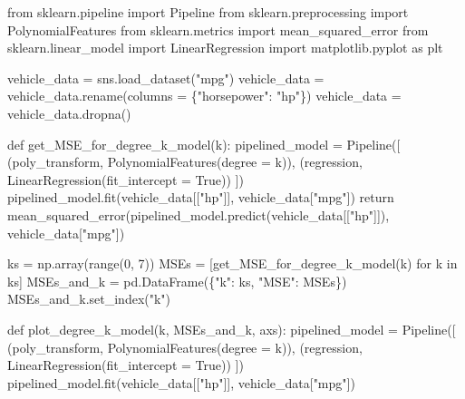 \documentclass[
  letterpaper,
  DIV=11,
  numbers=noendperiod]{scrreprt}
\newenvironment{Shaded}{\begin{snugshade}}{\end{snugshade}}
\newcommand{\BuiltInTok}[1]{\textcolor[rgb]{0.00,0.23,0.31}{#1}}
\newcommand{\ControlFlowTok}[1]{\textcolor[rgb]{0.00,0.23,0.31}{#1}}
\newcommand{\DecValTok}[1]{\textcolor[rgb]{0.68,0.00,0.00}{#1}}
\newcommand{\ImportTok}[1]{\textcolor[rgb]{0.00,0.46,0.62}{#1}}
\newcommand{\KeywordTok}[1]{\textcolor[rgb]{0.00,0.23,0.31}{#1}}
\newcommand{\NormalTok}[1]{\textcolor[rgb]{0.00,0.23,0.31}{#1}}
\newcommand{\OperatorTok}[1]{\textcolor[rgb]{0.37,0.37,0.37}{#1}}
\newcommand{\StringTok}[1]{\textcolor[rgb]{0.13,0.47,0.30}{#1}}
\newcommand{\VariableTok}[1]{\textcolor[rgb]{0.07,0.07,0.07}{#1}}
\begin{document}
\begin{Shaded}
\begin{Highlighting}[]
\ImportTok{from}\NormalTok{ sklearn.pipeline }\ImportTok{import}\NormalTok{ Pipeline}
\ImportTok{from}\NormalTok{ sklearn.preprocessing }\ImportTok{import}\NormalTok{ PolynomialFeatures}
\ImportTok{from}\NormalTok{ sklearn.metrics }\ImportTok{import}\NormalTok{ mean\_squared\_error}
\ImportTok{from}\NormalTok{ sklearn.linear\_model }\ImportTok{import}\NormalTok{ LinearRegression}
\ImportTok{import}\NormalTok{ matplotlib.pyplot }\ImportTok{as}\NormalTok{ plt}


\NormalTok{vehicle\_data }\OperatorTok{=}\NormalTok{ sns.load\_dataset(}\StringTok{"mpg"}\NormalTok{)}
\NormalTok{vehicle\_data }\OperatorTok{=}\NormalTok{ vehicle\_data.rename(columns }\OperatorTok{=}\NormalTok{ \{}\StringTok{"horsepower"}\NormalTok{: }\StringTok{"hp"}\NormalTok{\})}
\NormalTok{vehicle\_data }\OperatorTok{=}\NormalTok{ vehicle\_data.dropna()}


\KeywordTok{def}\NormalTok{ get\_MSE\_for\_degree\_k\_model(k):}
\NormalTok{    pipelined\_model }\OperatorTok{=}\NormalTok{ Pipeline([}
\NormalTok{        (}\StringTok{\textquotesingle{}poly\_transform\textquotesingle{}}\NormalTok{, PolynomialFeatures(degree }\OperatorTok{=}\NormalTok{ k)),}
\NormalTok{        (}\StringTok{\textquotesingle{}regression\textquotesingle{}}\NormalTok{, LinearRegression(fit\_intercept }\OperatorTok{=} \VariableTok{True}\NormalTok{))    }
\NormalTok{    ])}
\NormalTok{    pipelined\_model.fit(vehicle\_data[[}\StringTok{"hp"}\NormalTok{]], vehicle\_data[}\StringTok{"mpg"}\NormalTok{])}
    \ControlFlowTok{return}\NormalTok{ mean\_squared\_error(pipelined\_model.predict(vehicle\_data[[}\StringTok{"hp"}\NormalTok{]]), vehicle\_data[}\StringTok{"mpg"}\NormalTok{])}

\NormalTok{ks }\OperatorTok{=}\NormalTok{ np.array(}\BuiltInTok{range}\NormalTok{(}\DecValTok{0}\NormalTok{, }\DecValTok{7}\NormalTok{))}
\NormalTok{MSEs }\OperatorTok{=}\NormalTok{ [get\_MSE\_for\_degree\_k\_model(k) }\ControlFlowTok{for}\NormalTok{ k }\KeywordTok{in}\NormalTok{ ks]}
\NormalTok{MSEs\_and\_k }\OperatorTok{=}\NormalTok{ pd.DataFrame(\{}\StringTok{"k"}\NormalTok{: ks, }\StringTok{"MSE"}\NormalTok{: MSEs\})}
\NormalTok{MSEs\_and\_k.set\_index(}\StringTok{"k"}\NormalTok{)}

\KeywordTok{def}\NormalTok{ plot\_degree\_k\_model(k, MSEs\_and\_k, axs):}
\NormalTok{    pipelined\_model }\OperatorTok{=}\NormalTok{ Pipeline([}
\NormalTok{        (}\StringTok{\textquotesingle{}poly\_transform\textquotesingle{}}\NormalTok{, PolynomialFeatures(degree }\OperatorTok{=}\NormalTok{ k)),}
\NormalTok{        (}\StringTok{\textquotesingle{}regression\textquotesingle{}}\NormalTok{, LinearRegression(fit\_intercept }\OperatorTok{=} \VariableTok{True}\NormalTok{))    }
\NormalTok{    ])}
\NormalTok{    pipelined\_model.fit(vehicle\_data[[}\StringTok{"hp"}\NormalTok{]], vehicle\_data[}\StringTok{"mpg"}\NormalTok{])}
    

\end{Highlighting}
\end{Shaded}
\end{document}
